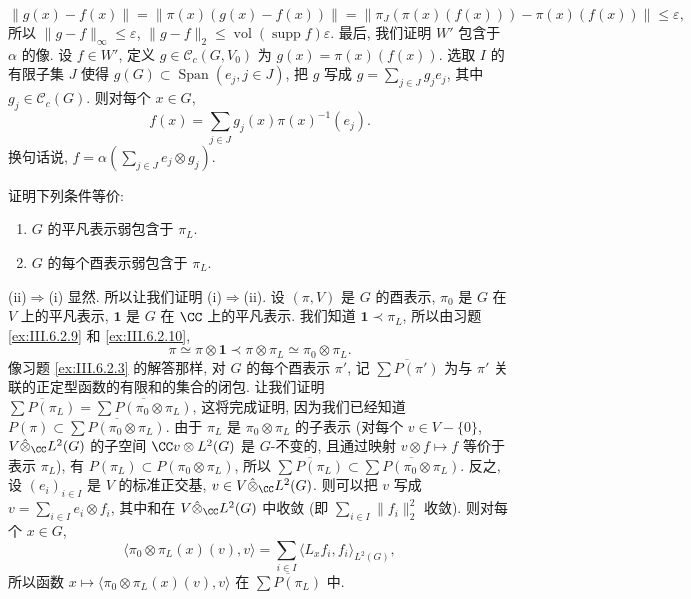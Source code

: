 \begin{solution}
\[
\|g(x) - f(x)\| = \|\pi(x)(g(x) - f(x))\| = \|\pi_J(\pi(x)(f(x))) - \pi(x)(f(x))\| \leq \varepsilon,
\]
所以 $\|g - f\|_{\infty} \leq \varepsilon$, $\|g - f\|_2 \leq \operatorname{vol}(\operatorname{supp} f)\varepsilon$. 最后, 我们证明 $W'$ 包含于 $\alpha$ 的像. 设 $f \in W'$, 定义 $g \in \mathcal{C}_c(G, V_0)$ 为 $g(x) = \pi(x)(f(x))$. 选取 $I$ 的有限子集 $J$ 使得 $g(G) \subset \operatorname{Span}(e_j, j \in J)$, 把 $g$ 写成 $g = \sum_{j \in J}g_je_j$, 其中 $g_j \in \mathcal{C}_c(G)$. 则对每个 $x \in G$,
\[
f(x) = \sum_{j \in J}g_j(x)\pi(x)^{-1}(e_j).
\]
换句话说, $f = \alpha(\sum_{j \in J}e_j \otimes g_j)$.
\end{solution}

\begin{exercise}[弱包含与平凡表示]
\label{ex:III.6.2.12}
证明下列条件等价:
\begin{enumerate}
\item[(i)] $G$ 的平凡表示弱包含于 $\pi_L$.
\item[(ii)] $G$ 的每个酉表示弱包含于 $\pi_L$.
\end{enumerate}
\end{exercise}

\begin{solution}
(ii)$\Rightarrow$(i) 显然. 所以让我们证明 (i)$\Rightarrow$(ii). 设 $(\pi, V)$ 是 $G$ 的酉表示, $\pi_0$ 是 $G$ 在 $V$ 上的平凡表示, $\mathbf{1}$ 是 $G$ 在 $\CC$ 上的平凡表示. 我们知道 $\mathbf{1} \prec \pi_L$, 所以由习题 \ref{ex:III.6.2.9} 和 \ref{ex:III.6.2.10},
\[
\pi \simeq \pi \otimes \mathbf{1} \prec \pi \otimes \pi_L \simeq \pi_0 \otimes \pi_L.
\]
像习题 \ref{ex:III.6.2.3} 的解答那样, 对 $G$ 的每个酉表示 $\pi'$, 记 $\overline{\sum P(\pi')}$ 为与 $\pi'$ 关联的正定型函数的有限和的集合的闭包. 让我们证明 $\overline{\sum P(\pi_L)} = \overline{\sum P(\pi_0 \otimes \pi_L)}$, 这将完成证明, 因为我们已经知道 $P(\pi) \subset \overline{\sum P(\pi_0 \otimes \pi_L)}$.
由于 $\pi_L$ 是 $\pi_0 \otimes \pi_L$ 的子表示 (对每个 $v \in V - \{0\}$, $V \hat{\otimes}_{\CC}L^2(G)$ 的子空间 $\CC v \otimes L^2(G)$ 是 $G$-不变的, 且通过映射 $v \otimes f \longmapsto f$ 等价于表示 $\pi_L$), 有 $P(\pi_L) \subset P(\pi_0 \otimes \pi_L)$, 所以 $\overline{\sum P(\pi_L)} \subset \overline{\sum P(\pi_0 \otimes \pi_L)}$. 反之, 设 $(e_i)_{i \in I}$ 是 $V$ 的标准正交基, $v \in V \hat{\otimes}_{\CC}L^2(G)$. 则可以把 $v$ 写成 $v = \sum_{i \in I}e_i \otimes f_i$, 其中和在 $V \hat{\otimes}_{\CC}L^2(G)$ 中收敛 (即 $\sum_{i \in I}\|f_i\|_2^2$ 收敛). 则对每个 $x \in G$,
\[
\langle \pi_0 \otimes \pi_L(x)(v), v \rangle = \sum_{i \in I}\langle L_xf_i, f_i \rangle_{L^2(G)},
\]
所以函数 $x \longmapsto \langle \pi_0 \otimes \pi_L(x)(v), v \rangle$ 在 $\overline{\sum P(\pi_L)}$ 中.
\end{solution}

